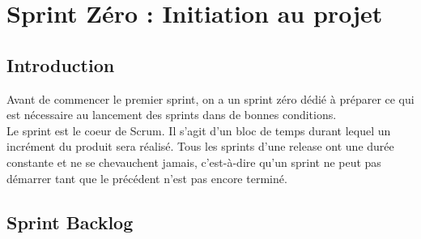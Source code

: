\graphicspath{{./chapitres/chapitre3/figures/}}
\chapter{Sprint Zéro : Initiation au projet }
\minitoc
\newpage
\section*{Introduction}

Avant de commencer le premier sprint, on a un sprint zéro dédié à préparer ce qui est nécessaire au lancement des sprints dans de bonnes conditions.\\
Le sprint est le coeur de Scrum. Il s'agit d'un bloc de temps durant lequel un incrément du produit sera réalisé. Tous les sprints d'une release ont une durée constante et ne se chevauchent jamais, c'est-à-dire qu'un sprint ne peut pas démarrer tant que le précédent n'est pas encore terminé. 




\section{Sprint Backlog}
